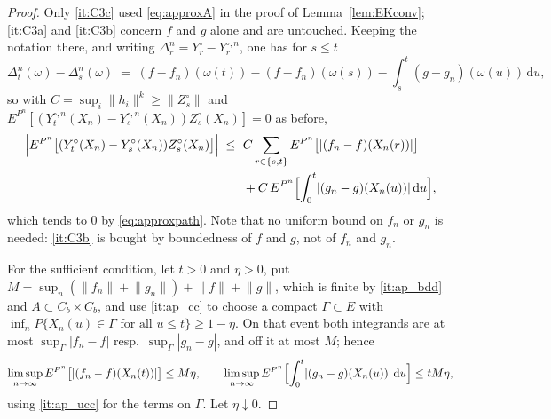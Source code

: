 \documentclass[11pt,a4paper]{article}
\theoremstyle{plain}
\theoremstyle{definition}
\theoremstyle{remark}
\newcommand{\Cb}{C_b}                          %
\newcommand{\dif}{\,\mathrm{d}}
\begin{document}
\begin{proof}
  Only \ref{it:C3c} used \eqref{eq:approxA} in the proof of
  Lemma~\ref{lem:EKconv}; \ref{it:C3a} and \ref{it:C3b} concern $f$ and $g$ alone
  and are untouched.  Keeping the notation there, and writing
  $\Delta^n_r = Y^\circ_r - Y^{\circ,n}_r$, one has for $s \leq t$
  \[
    \Delta^n_t(\omega) - \Delta^n_s(\omega)
      \;=\; (f-f_n)(\omega(t)) - (f-f_n)(\omega(s))
        - \int_s^t (g-g_n)(\omega(u)) \dif u ,
  \]
  so with $C = \sup_i \lVert h_i \rVert^k \geq \lVert Z^\circ_s \rVert$ and
  $E^{P^n}[(Y^{\circ,n}_t(X_n) - Y^{\circ,n}_s(X_n)) Z^\circ_s(X_n)] = 0$ as before,
  \begin{align*}
    \Bigl| E^{P^n}\bigl[ (Y^\circ_t(X_n) - Y^\circ_s(X_n)) Z^\circ_s(X_n) \bigr] \Bigr|
      \;\leq\;\ & C \sum_{r \in \{s,t\}} E^{P^n}\bigl[ \lvert (f_n-f)(X_n(r)) \rvert \bigr] \\
      &{}+ C\, E^{P^n}\Bigl[ \int_0^t \lvert (g_n-g)(X_n(u)) \rvert \dif u \Bigr] ,
  \end{align*}
  which tends to $0$ by \eqref{eq:approxpath}.  Note that no uniform bound on
  $f_n$ or $g_n$ is needed: \ref{it:C3b} is bought by boundedness of $f$ and $g$,
  not of $f_n$ and $g_n$.

  For the sufficient condition, let $t > 0$ and $\eta > 0$, put
  $M = \sup_n ( \lVert f_n \rVert + \lVert g_n \rVert ) + \lVert f \rVert + \lVert g \rVert$,
  which is finite by \ref{it:ap_bdd} and $A \subset \Cb \times \Cb$, and use
  \ref{it:ap_cc} to choose a compact $\Gamma \subset E$ with
  $\inf_n P\{ X_n(u) \in \Gamma \text{ for all } u \leq t \} \geq 1 - \eta$.  On
  that event both integrands are at most $\sup_\Gamma |f_n - f|$ resp.\
  $\sup_\Gamma |g_n - g|$, and off it at most $M$; hence
  \[
    \limsup_{n \to \infty} E^{P^n}\bigl[ \lvert (f_n-f)(X_n(t)) \rvert \bigr] \leq M \eta ,
    \qquad
    \limsup_{n \to \infty} E^{P^n}\Bigl[ \int_0^t \lvert (g_n-g)(X_n(u)) \rvert \dif u \Bigr]
      \leq t M \eta ,
  \]
  using \ref{it:ap_ucc} for the terms on $\Gamma$.  Let $\eta \downarrow 0$.
\end{proof}
\end{document}
